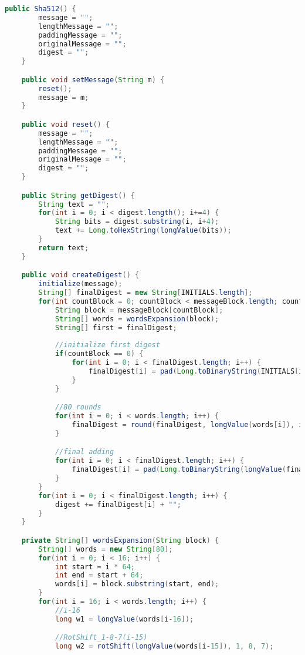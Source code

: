 \begin{lstlisting}[language=Java,basicstyle=\tiny,caption=Sha512.java]
    public Sha512() {
        message = "";
        lengthMessage = "";
        paddingMessage = "";
        originalMessage = "";
        digest = "";
    }

    public void setMessage(String m) {
        reset();
        message = m;
    }

    public void reset() {
        message = "";
        lengthMessage = "";
        paddingMessage = "";
        originalMessage = "";
        digest = "";
    }

    public String getDigest() {
        String text = "";
        for(int i = 0; i < digest.length(); i+=4) {
            String bits = digest.substring(i, i+4);
            text += Long.toHexString(longValue(bits));
        }
        return text;
    }

    public void createDigest() {
        initialize(message);
        String[] finalDigest = new String[INITIALS.length];
        for(int countBlock = 0; countBlock < messageBlock.length; countBlock++) {
            String block = messageBlock[countBlock];
            String[] words = wordsExpansion(block);
            String[] first = finalDigest;
            
            //initialize first digest
            if(countBlock == 0) {
                for(int i = 0; i < finalDigest.length; i++) {
                    finalDigest[i] = pad(Long.toBinaryString(INITIALS[i]));
                }
            }

            //80 rounds
            for(int i = 0; i < words.length; i++) {
                finalDigest = round(finalDigest, longValue(words[i]), i);
            }

            //final adding
            for(int i = 0; i < finalDigest.length; i++) {
                finalDigest[i] = pad(Long.toBinaryString(longValue(finalDigest[i]) + longValue(first[i])));
            }
        }
        for(int i = 0; i < finalDigest.length; i++) {
            digest += finalDigest[i] + "";
        }
    }

    private String[] wordsExpansion(String block) {
        String[] words = new String[80];
        for(int i = 0; i < 16; i++) {
            int start = i * 64;
            int end = start + 64;
            words[i] = block.substring(start, end);
        }
        for(int i = 16; i < words.length; i++) {
            //i-16
            long w1 = longValue(words[i-16]);

            //RotShift_1-8-7(i-15)
            long w2 = rotShift(longValue(words[i-15]), 1, 8, 7);


\end{lstlisting}
